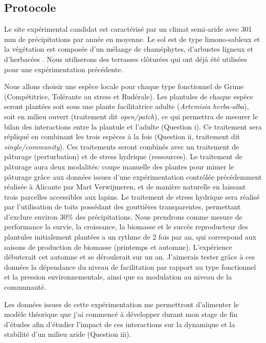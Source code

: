 \documentclass[12pt]{article} %
\begin{document}
\subsection{Protocole}

Le site expérimental candidat est caractérisé par un climat semi-aride  avec 301 mm de précipitations par année en moyenne. Le sol est de type limono-sableux et la végétation est composée d'un mélange de chaméphytes, d'arbustes ligneux et d'herbacées \citep{Verwijmeren2014}. Nous utiliserons des terrasses clôturées qui ont déjà été utilisées pour une expérimentation précédente. %

Nous allons choisir une espèce locale pour chaque type fonctionnel de Grime (Compétitrice, Tolérante au stress et Rudérale). Les plantules de chaque espèce seront plantées soit sous une plante facilitatrice adulte (\textit{Artemisia herba-alba}), soit en milieu ouvert (traitement dit \textit{open/patch}), ce qui permettra de mesurer le bilan des interactions entre la plantule et l'adulte (Question i). Ce traitement sera répliqué en combinant les trois espèces à la fois (Question ii, traitement dit \textit{single/community}). Ces traitements seront combinés avec un traitement de pâturage (perturbation) et de stress hydrique (ressources). Le traitement de pâturage aura deux modalités: coupe manuelle des plantes pour mimer le pâturage grâce aux données issues d'une expérimentation contrôlée précédemment réalisée à Alicante par Mart Verwijmeren, et de manière naturelle en laissant trois parcelles accessibles aux lapins. Le traitement de stress hydrique sera réalisé par l'utilisation de toits possédant des gouttières transparentes, permettant d'exclure environ 30\% des précipitations. Nous prendrons comme mesure de performance la survie, la croissance, la biomasse et le succès reproducteur des plantules initialement plantées a un rythme de 2 fois par an, qui correspond aux saisons de production de biomasse (printemps et automne). L'expérience débuterait cet automne et se déroulerait sur un an. J'aimerais tester grâce à ces données la dépendance du niveau de facilitation par rapport au type fonctionnel et la pression environnementale, ainsi que sa modulation au niveau de la communauté.

Les données issues de cette expérimentation me permettront d'alimenter le modèle théorique que j'ai commencé à développer durant mon stage de fin d'études afin d'étudier l'impact de ces interactions sur la dynamique et la stabilité d'un milieu aride (Question iii).
\end{document}
